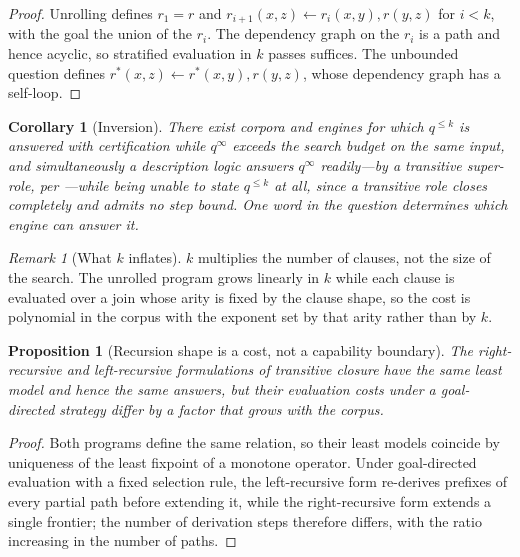 \documentclass[11pt,a4paper]{article}
\theoremstyle{plain}
\newtheorem{proposition}[theorem]{Proposition}
\newtheorem{corollary}[theorem]{Corollary}
\theoremstyle{definition}
\theoremstyle{remark}
\newtheorem{remark}[theorem]{Remark}
\newcommand{\qq}{q}
\begin{document}
\begin{proof}
Unrolling defines $r_1 = r$ and
$r_{i+1}(x,z) \leftarrow r_i(x,y), r(y,z)$ for $i < k$, with the goal the union
of the $r_i$. The dependency graph on the $r_i$ is a path and hence acyclic,
so stratified evaluation in $k$ passes suffices. The unbounded question defines
$r^*(x,z) \leftarrow r^*(x,y), r(y,z)$, whose dependency graph has a self-loop.
\end{proof}

\begin{corollary}[Inversion]
\label{cor:inversion}
There exist corpora and engines for which $\qq^{\leq k}$ is answered with
certification while $\qq^\infty$ exceeds the search budget on the same input,
and simultaneously a description logic answers $\qq^\infty$ readily---by a
transitive super-role, per ---while being unable
to \emph{state} $\qq^{\leq k}$ at all, since a transitive role closes
completely and admits no step bound. One word in the question determines which
engine can answer it.
\end{corollary}

\begin{remark}[What $k$ inflates]
\label{rem:k-inflates}
$k$ multiplies the number of clauses, not the size of the search. The
unrolled program grows linearly in $k$ while each clause is evaluated over a
join whose arity is fixed by the clause shape, so the cost is polynomial in
the corpus with the exponent set by that arity rather than by $k$.
\end{remark}

\begin{proposition}[Recursion shape is a cost, not a capability boundary]
\label{prop:recursion-shape}
The right-recursive and left-recursive formulations of transitive closure have
the same least model and hence the same answers, but their evaluation costs
under a goal-directed strategy differ by a factor that grows with the corpus.
\end{proposition}

\begin{proof}
Both programs define the same relation, so their least models coincide by
uniqueness of the least fixpoint of a monotone operator. Under goal-directed
evaluation with a fixed selection rule, the left-recursive form re-derives
prefixes of every partial path before extending it, while the right-recursive
form extends a single frontier; the number of derivation steps therefore
differs, with the ratio increasing in the number of paths.
\end{proof}
\end{document}
